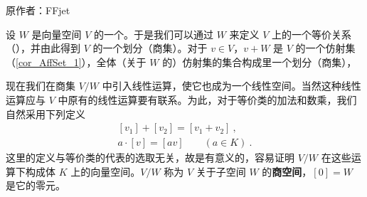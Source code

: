 
\begin{issues}
\issueDraft
\end{issues}


原作者：FFjet


设 $W$ 是向量空间 $V$ 的一个。于是我们可以通过 $W$ 来定义 $V$ 上的一个等价关系（），并由此得到 $V$ 的一个划分（商集）。对于 $v \in V$，$v + W$ 是 $V$ 的一个仿射集（\autoref{cor_AffSet_1}），全体（关于 $W$ 的）仿射集的集合构成里一个划分（商集），




现在我们在商集 $V / W$ 中引入线性运算，使它也成为一个线性空间。当然这种线性运算应与 $V$ 中原有的线性运算要有联系。为此，对于等价类的加法和数乘，我们自然采用下列定义
\begin{equation}
\begin{array}{l}
[v_1] + [v_2] = [v_1 + v_2]~, \\
a \cdot [v] = [a v]\qquad (a \in K)~.
\end{array}
\end{equation}
这里的定义与等价类的代表的选取无关，故是有意义的，容易证明 $V/W $ 在这些运算下构成体 $K $ 上的向量空间。$V/W $ 称为 $V$ 关于子空间 $W$ 的\textbf{商空间}，$[0] = W$ 是它的零元。

